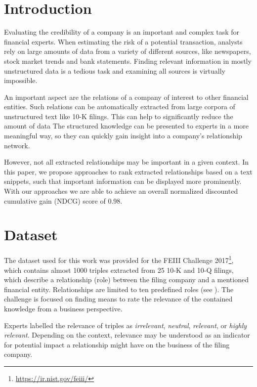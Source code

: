 \section{Introduction}

Evaluating the credibility of a company is an important and complex task for financial experts.
When estimating the risk of a potential transaction, analysts rely on large amounts of data from a variety of different sources, like newspapers, stock market trends and bank statements.
Finding relevant information in mostly unstructured data is a tedious task and examining all sources is virtually impossible.

An important aspect are the relations of a company of interest to other financial entities.
Such relations can be automatically extracted from large corpora of unstructured text\cite{entityextraction} like 10-K filings.
This can help to significantly reduce the amount of data
The structured knowledge can be presented to experts in a more meaningful way, so they can quickly gain insight into a company's relationship network.

However, not all extracted relationships may be important in a given context.
In this paper, we propose approaches to rank extracted relationships based on a text snippets, such that important information can be displayed more prominently.
With our approaches we are able to achieve an overall normalized discounted cumulative gain (NDCG) score of 0.98.

\section{Dataset}
The dataset used for this work was provided for the FEIII Challenge 2017\footnote{\url{https://ir.nist.gov/feiii/}}, which contains almost 1000 triples extracted from 25 10-K and 10-Q filings, which describe a relationship (role) between the filing company and a mentioned financial entity.
Relationships are limited to ten predefined roles (see ).
The challenge is focused on finding means to rate the relevance of the contained knowledge from a business perspective.

Experts labelled the relevance of triples as \textit{irrelevant}, \textit{neutral}, \textit{relevant}, or \textit{highly relevant}.
Depending on the context, relevance may be understood as an indicator for potential impact a relationship might have on the business of the filing company. 

